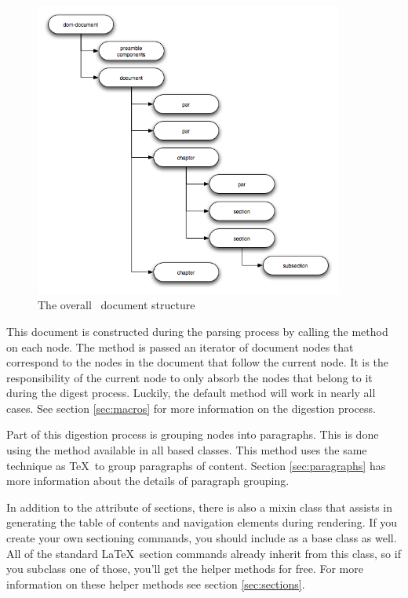\begin{figure}[ht]
\begin{center}
\includegraphics[width=4in]{docstructure}
\end{center}
\caption{The overall \plasTeX\ document structure\label{fig:docstructure}}
\end{figure}

This document is constructed during the parsing process by calling the 
 method on each node.  The  method is passed
an iterator of document nodes that correspond to the nodes in the document
that follow the current node.  It is the 
responsibility of the current node to only absorb the nodes that belong
to it during the digest process.  Luckily, the default 
method will work in nearly all cases.  See section \ref{sec:macros} for more
information on the digestion process.

Part of this digestion process is grouping nodes into paragraphs.  This
is done using the  method available in all 
based classes.  This method uses the same technique as \TeX\ to group
paragraphs of content.  Section \ref{sec:paragraphs} has more information
about the details of paragraph grouping.

In addition to the  attribute of sections, there is also a
mixin class that assists in generating the table of contents and navigation
elements during rendering.  If you create your own sectioning commands,
you should include  as
a base class as well.  All of the standard \LaTeX\ section commands already
inherit from this class, so if you subclass one of those, you'll get
the helper methods for free.  For more information on these helper methods
see section \ref{sec:sections}.

